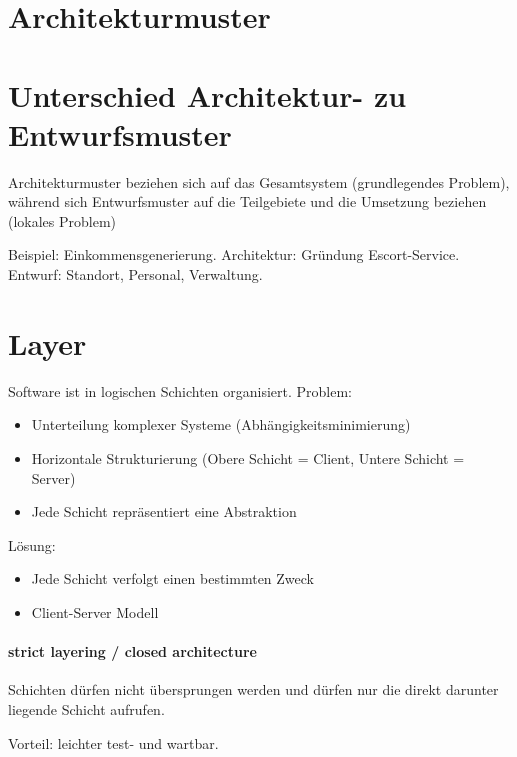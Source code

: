 \section{Architekturmuster}\label{architekturmuster}

\section{Unterschied Architektur- zu
Entwurfsmuster}\label{unterschied-architektur--zu-entwurfsmuster}

Architekturmuster beziehen sich auf das Gesamtsystem (grundlegendes
Problem), während sich Entwurfsmuster auf die Teilgebiete und die
Umsetzung beziehen (lokales Problem)

Beispiel: Einkommensgenerierung. Architektur: Gründung Escort-Service.
Entwurf: Standort, Personal, Verwaltung.

\section{Layer}\label{layer}

Software ist in logischen Schichten organisiert. Problem:

\begin{itemize}
\itemsep1pt\parskip0pt
\item
  Unterteilung komplexer Systeme (Abhängigkeitsminimierung)
\item
  Horizontale Strukturierung (Obere Schicht = Client, Untere Schicht =
  Server)
\item
  Jede Schicht repräsentiert eine Abstraktion
\end{itemize}

Lösung:

\begin{itemize}
\itemsep1pt\parskip0pt
\item
  Jede Schicht verfolgt einen bestimmten Zweck
\item
  Client-Server Modell
\end{itemize}

\paragraph{strict layering / closed
architecture}\label{strict-layering-closed-architecture}

Schichten dürfen nicht übersprungen werden und dürfen nur die direkt
darunter liegende Schicht aufrufen.

Vorteil: leichter test- und wartbar.

